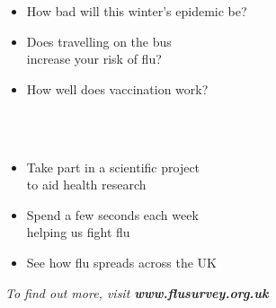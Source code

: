 \documentclass[12pt]{article}
\begin{document}
\pagestyle{empty}
{\large \begin{itemize}
\item How bad will this winter's epidemic be?
\item Does travelling on the bus\\increase your risk of flu?
\item How well does vaccination work?
\end{itemize}}
\vspace{0.3cm}
\\
\vspace{0.1cm}\\
\begin{itemize}
\item Take part in a scientific project\\to aid health research
\item Spend a few seconds each week\\helping us fight flu
\item See how flu spreads across the UK
\end{itemize}
\vspace{1cm}
{\small \it To find out more, visit {\bf www.flusurvey.org.uk}}
\end{document}
